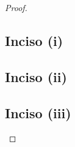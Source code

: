 \begin{proof}
    \subsection{Inciso (i)}     \label{problema2_4:inciso1}
    
    \newpage
    
    \subsection{Inciso (ii)}    \label{problema2_4:inciso2}
    
    \newpage
        
    \subsection{Inciso (iii)}    \label{problema2_4:inciso3}
    
    \newpage
    
\end{proof}